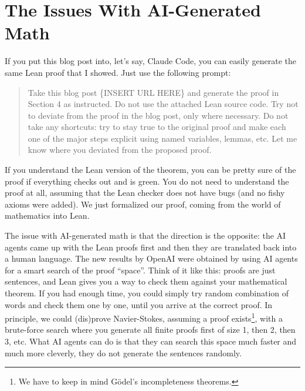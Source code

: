 \documentclass{article}
\begin{document}
\section{The Issues With AI-Generated Math}
\label{issues}

If you put this blog post into, let's say, Claude Code, you can easily generate the same Lean proof that I showed.
Just use the following prompt:
\begin{quote}
Take this blog post \{INSERT URL HERE\} and generate the proof in Section 4 as instructed.
Do not use the attached Lean source code. 
Try not to deviate from the proof in the blog post, only where necessary.
Do not take any shortcuts: try to stay true to the original proof and make each one of the major steps explicit using named variables, lemmas, etc.
Let me know where you deviated from the proposed proof.
\end{quote}

If you understand the Lean version of the theorem, you can be pretty sure of the proof if everything checks out and is green.
You do not need to understand the proof at all, assuming that the Lean checker does not have bugs (and no fishy axioms were added).
We just formalized our proof, coming from the world of mathematics into Lean.

The issue with AI-generated math is that the direction is the opposite: the AI agents came up with the Lean proofs first and then they are  translated back into a human language.
The new results by OpenAI were obtained by using AI agents for a smart search of the proof ``space''.
Think of it like this: proofs are just sentences, and Lean gives you a way to check them against your mathematical theorem. 
If you had enough time, you could simply try random combination of words and check them one by one, until you arrive at the correct proof.
In principle, we could (dis)prove Navier-Stokes, assuming a proof exists\footnote{We have to keep in mind G\"odel's incompleteness theorems.}, with a brute-force search where you generate all finite proofs first of size 1, then 2, then 3, etc.
What AI agents can do is that they can search this space much faster and much more cleverly, they do not generate the sentences randomly.
\end{document}
